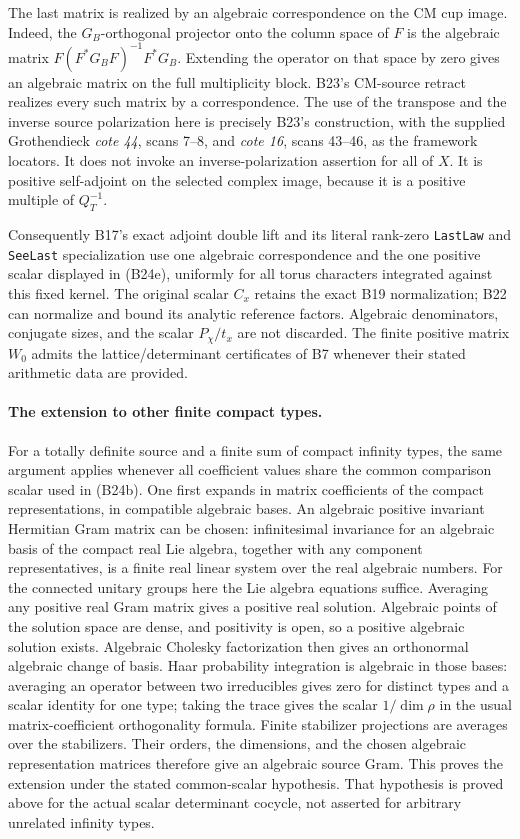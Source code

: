 \documentclass[11pt]{article}
\theoremstyle{definition}\newtheorem{definition}[theorem]{Definition}\newtheorem{remark}[theorem]{Remark}
\begin{document}
The last matrix is realized by an algebraic
correspondence on the CM cup image.  Indeed,
the $G_B$-orthogonal projector onto the
column space of $F$ is the algebraic matrix
$F(F^*G_BF)^{-1}F^*G_B$.  Extending the
operator on that space by zero gives an
algebraic matrix on the full multiplicity
block.  B23's CM-source retract realizes
every such matrix by a correspondence.
The use of the transpose and the inverse source
polarization here is precisely B23's construction,
with the supplied Grothendieck \emph{cote 44},
scans 7--8, and \emph{cote 16}, scans 43--46,
as the framework locators.  It does not invoke
an inverse-polarization assertion for all of $X$.
It is positive self-adjoint on the selected
complex image, because it is a positive
multiple of $Q_T^{-1}$.

Consequently B17's exact adjoint double lift
and its literal rank-zero \texttt{LastLaw}
and \texttt{SeeLast} specialization use one
algebraic correspondence and the one positive
scalar displayed in (B24e), uniformly for
all torus characters integrated against this
fixed kernel.  The original scalar $C_x$
retains the exact B19 normalization; B22 can
normalize and bound its analytic reference
factors.  Algebraic denominators, conjugate
sizes, and the scalar $P_\chi/t_x$ are not
discarded.  The finite positive matrix $W_0$
admits the lattice/determinant certificates
of B7 whenever their stated arithmetic data
are provided.

\paragraph{The extension to other finite compact types.}
For a totally definite source and a finite
sum of compact infinity types, the same
argument applies whenever all coefficient
values share the common comparison scalar
used in (B24b).  One first expands in
matrix coefficients of the compact
representations, in compatible algebraic
bases.  An algebraic positive invariant Hermitian
Gram matrix can be chosen: infinitesimal invariance
for an algebraic basis of the compact real Lie
algebra, together with any component representatives,
is a finite real linear system over the real
algebraic numbers.  For the connected unitary groups
here the Lie algebra equations suffice.  Averaging
any positive real Gram matrix gives a positive real
solution.  Algebraic points of the solution space
are dense, and positivity is open, so a positive
algebraic solution exists.  Algebraic Cholesky
factorization then gives an orthonormal algebraic
change of basis.  Haar probability integration is
algebraic in those bases: averaging an
operator between two irreducibles gives
zero for distinct types and a scalar
identity for one type; taking the trace
gives the scalar $1/\dim\rho$ in the
usual matrix-coefficient orthogonality
formula.  Finite stabilizer projections
are averages over the stabilizers.
Their orders, the dimensions, and the
chosen algebraic representation matrices
therefore give an algebraic source Gram.
This proves the extension under the stated
common-scalar hypothesis.  That hypothesis
is proved above for the actual scalar
determinant cocycle, not asserted for
arbitrary unrelated infinity types.
\end{document}
